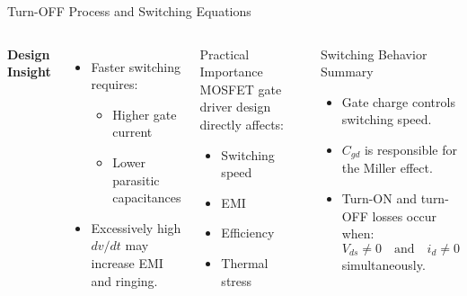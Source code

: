 \begin{frame}{Turn-OFF Process and Switching Equations}
\begin{columns}[T]
\textbf{Design Insight}
\begin{itemize}
    \item Faster switching requires:
    \begin{itemize}
        \item Higher gate current
        \item Lower parasitic capacitances
    \end{itemize}
    \item Excessively high $dv/dt$ may increase EMI and ringing.
\end{itemize}

\begin{block}{Practical Importance}
MOSFET gate driver design directly affects:
\begin{itemize}
    \item Switching speed
    \item EMI
    \item Efficiency
    \item Thermal stress
\end{itemize}
\end{block}

\begin{block}{Switching Behavior Summary}
\begin{itemize}
    \item Gate charge controls switching speed.
    \item $C_{gd}$ is responsible for the Miller effect.
    \item Turn-ON and turn-OFF losses occur when:
    \[
    V_{ds} \neq 0
    \quad \text{and} \quad
    i_d \neq 0
    \]
    simultaneously.
\end{itemize}
\end{block}
\end{columns}
\end{frame}



